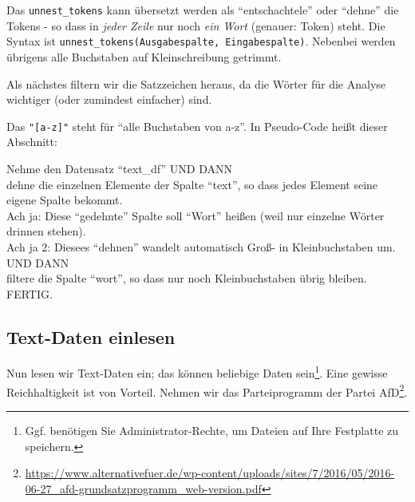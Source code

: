 \documentclass[12pt,ngerman,]{book}
\makeatletter
\newenvironment{Shaded}{\begin{snugshade}}{\end{snugshade}}
\newcommand{\KeywordTok}[1]{\textcolor[rgb]{0.13,0.29,0.53}{\textbf{{#1}}}}
\newcommand{\StringTok}[1]{\textcolor[rgb]{0.31,0.60,0.02}{{#1}}}
\newcommand{\CommentTok}[1]{\textcolor[rgb]{0.56,0.35,0.01}{\textit{{#1}}}}
\newcommand{\NormalTok}[1]{{#1}}
\let\rmarkdownfootnote\footnote%
\def\footnote{\protect\rmarkdownfootnote}
\newenvironment{kframe}{%
\medskip{}
\setlength{\fboxsep}{.8em}
 \def\at@end@of@kframe{}%
 \ifinner\ifhmode%
  \def\at@end@of@kframe{\end{minipage}}%
  \begin{minipage}{\columnwidth}%
 \fi\fi%
 \def\FrameCommand##1{\hskip\@totalleftmargin \hskip-\fboxsep
 \colorbox{shadecolor}{##1}\hskip-\fboxsep
     \hskip-\linewidth \hskip-\@totalleftmargin \hskip\columnwidth}%
 \MakeFramed {\advance\hsize-\width
   \@totalleftmargin\z@ \linewidth\hsize
   \@setminipage}}%
 {\par\unskip\endMakeFramed%
 \at@end@of@kframe}
\renewenvironment{Shaded}{\begin{kframe}}{\end{kframe}}
\let\BeginKnitrBlock\begin \let\EndKnitrBlock\end
\makeatother
\begin{document}
Das \texttt{unnest\_tokens} kann übersetzt werden als ``entschachtele''
oder ``dehne'' die Tokens - so dass in \emph{jeder Zeile} nur noch
\emph{ein Wort} (genauer: Token) steht. Die Syntax ist
\texttt{unnest\_tokens(Ausgabespalte,\ Eingabespalte)}. Nebenbei werden
übrigens alle Buchstaben auf Kleinschreibung getrimmt.

Als nächstes filtern wir die Satzzeichen heraus, da die Wörter für die
Analyse wichtiger (oder zumindest einfacher) sind.

\begin{Shaded}
\end{Shaded}

Das \texttt{"{[}a-z{]}"} steht für ``alle Buchstaben von a-z''. In
Pseudo-Code heißt dieser Abschnitt:

\BeginKnitrBlock{rmdpseudocode}
Nehme den Datensatz ``text\_df'' UND DANN\\
dehne die einzelnen Elemente der Spalte ``text'', so dass jedes Element
seine eigene Spalte bekommt.\\
Ach ja: Diese ``gedehnte'' Spalte soll ``Wort'' heißen (weil nur
einzelne Wörter drinnen stehen).\\
Ach ja 2: Diesees ``dehnen'' wandelt automatisch Groß- in
Kleinbuchstaben um. UND DANN\\
filtere die Spalte ``wort'', so dass nur noch Kleinbuchstaben übrig
bleiben. FERTIG.
\EndKnitrBlock{rmdpseudocode}

\subsection{Text-Daten einlesen}\label{text-daten-einlesen}

Nun lesen wir Text-Daten ein; das können beliebige Daten sein\footnote{Ggf.
  benötigen Sie Administrator-Rechte, um Dateien auf Ihre Festplatte zu
  speichern.}. Eine gewisse Reichhaltigkeit ist von Vorteil. Nehmen wir
das Parteiprogramm der Partei AfD\footnote{\url{https://www.alternativefuer.de/wp-content/uploads/sites/7/2016/05/2016-06-27_afd-grundsatzprogramm_web-version.pdf}}.
\end{document}
